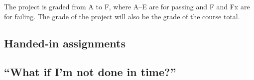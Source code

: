 The project is graded from A to F, where A--E are for passing and F and Fx are 
for failing.
The grade of the project will also be the grade of the course total.

\subsection{Handed-in assignments}


\subsection{\enquote{What if I'm not done in time?}}%
\label{sec:late}



\printbibliography{}
